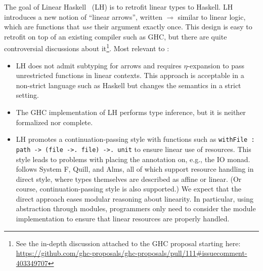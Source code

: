 The goal of Linear Haskell~\citep{DBLP:journals/pacmpl/BernardyBNJS18}
(LH) is to retrofit linear types to Haskell.
LH introduces a new notion
of ``linear arrows'', written $\multimap$ similar to linear logic,
which are functions that \emph{use} their argument exactly once.
This design is easy to retrofit on top of an existing compiler
such as GHC, but there are quite controversial discussions about it\footnote{
  See the in-depth discussion attached to the GHC proposal starting here: \url{https://github.com/ghc-proposals/ghc-proposals/pull/111\#issuecomment-403349707}}.
Most relevant to \lang:
\begin{itemize}[leftmargin=*]
\item LH does not admit subtyping for arrows and requires
  $\eta$-expansion to pass unrestricted functions in linear
  contexts. This approach is acceptable in a non-strict language such as
  Haskell but changes the semantics in a strict setting.
\item
  The GHC implementation of LH performs type inference, but
  it is neither formalized nor complete.
\item
  LH promotes a continuation-passing style with functions such as
  \lstinline/withFile : path -> (file ->. file) ->. unit/
  to ensure linear use of resources. This style leads to problems with
  placing the annotation on, e.g., the IO monad.
  \lang follows System F\degree, Quill, and Alms, all of which support
  resource handling in direct style, where types themselves are
  described as affine or linear. (Or course, continuation-passing
  style is also supported.)
  We expect that the direct approach eases modular reasoning about linearity.
  In particular, using abstraction through modules,
  programmers only need to consider the module
  implementation to ensure that linear
  resources are properly handled.
\end{itemize}


